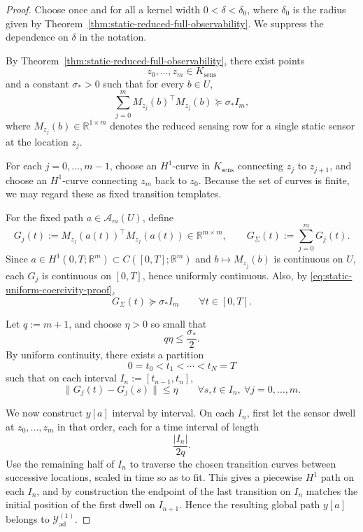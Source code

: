 \documentclass{article}
\theoremstyle{definition}
\begin{document}
\begin{proof}
    Choose once and for all a kernel width \(0<\delta<\delta_0\), where \(\delta_0\) is the radius
    given by Theorem~\ref{thm:static-reduced-full-observability}. We suppress the dependence on
    \(\delta\) in the notation.

    By Theorem~\ref{thm:static-reduced-full-observability}, there exist points
    \[
        z_0,\dots,z_m\in K_{\mathrm{sens}}
    \]
    and a constant \(\sigma_*>0\) such that for every \(b\in U\),
    \begin{equation}
        \label{eq:static-uniform-coercivity-proof}
        \sum_{j=0}^m M_{z_j}(b)^\top M_{z_j}(b)
        \succeq
        \sigma_* I_m,
    \end{equation}
    where \(M_{z_j}(b)\in \mathbb R^{1\times m}\) denotes the reduced sensing row for a single static
    sensor at the location \(z_j\).

    For each \(j=0,\dots,m-1\), choose an \(H^1\)-curve in \(K_{\mathrm{sens}}\) connecting
    \(z_j\) to \(z_{j+1}\), and choose an \(H^1\)-curve connecting \(z_m\) back to \(z_0\). Because the
    set of curves is finite, we may regard these as fixed transition templates.

    For the fixed path \(a\in \mathcal A_m(U)\), define
    \[
        G_j(t):=M_{z_j}(a(t))^\top M_{z_j}(a(t))
        \in \mathbb R^{m\times m},
        \qquad
        G_\Sigma(t):=\sum_{j=0}^m G_j(t).
    \]
    Since \(a\in H^1(0,T;\mathbb R^m)\subset C([0,T];\mathbb R^m)\) and
    \(b\mapsto M_{z_j}(b)\) is continuous on \(U\), each \(G_j\) is continuous on \([0,T]\), hence
    uniformly continuous. Also, by \eqref{eq:static-uniform-coercivity-proof},
    \begin{equation}
        \label{eq:Gsigma-lower-bound}
        G_\Sigma(t)\succeq \sigma_* I_m
        \qquad\forall t\in[0,T].
    \end{equation}

    Let \(q:=m+1\), and choose \(\eta>0\) so small that
    \[
        q\eta \le \frac{\sigma_*}{2}.
    \]
    By uniform continuity, there exists a partition
    \[
        0=t_0<t_1<\cdots<t_N=T
    \]
    such that on each interval \(I_n:=[t_{n-1},t_n]\),
    \begin{equation}
        \label{eq:Gj-small-variation}
        \|G_j(t)-G_j(s)\|\le \eta
        \qquad
        \forall s,t\in I_n,\ \forall j=0,\dots,m.
    \end{equation}

    We now construct \(y[a]\) interval by interval. On each \(I_n\), first let the sensor dwell at
    \(z_0,\dots,z_m\) in that order, each for a time interval of length
    \[
        \frac{|I_n|}{2q}.
    \]
    Use the remaining half of \(I_n\) to traverse the chosen transition curves between successive
    locations, scaled in time so as to fit. This gives a piecewise \(H^1\) path on each \(I_n\), and by
    construction the endpoint of the last transition on \(I_n\) matches the initial position of the first
    dwell on \(I_{n+1}\). Hence the resulting global path \(y[a]\) belongs to
    \(\mathcal Y_{\mathrm{ad}}^{(1)}\).


\end{proof}
\end{document}
